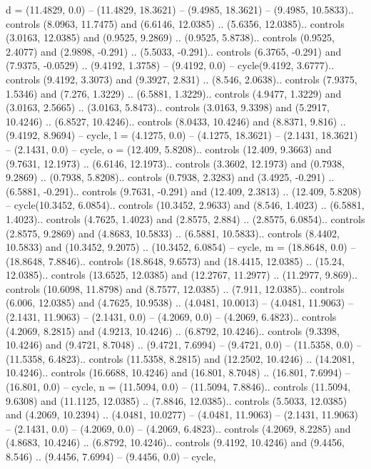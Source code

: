 {d} = {(11.4829, 0.0) -- (11.4829, 18.3621) -- (9.4985, 18.3621) -- (9.4985, 10.5833).. controls (8.0963, 11.7475) and (6.6146, 12.0385) .. (5.6356, 12.0385).. controls (3.0163, 12.0385) and (0.9525, 9.2869) .. (0.9525, 5.8738).. controls (0.9525, 2.4077) and (2.9898, -0.291) .. (5.5033, -0.291).. controls (6.3765, -0.291) and (7.9375, -0.0529) .. (9.4192, 1.3758) -- (9.4192, 0.0) -- cycle(9.4192, 3.6777).. controls (9.4192, 3.3073) and (9.3927, 2.831) .. (8.546, 2.0638).. controls (7.9375, 1.5346) and (7.276, 1.3229) .. (6.5881, 1.3229).. controls (4.9477, 1.3229) and (3.0163, 2.5665) .. (3.0163, 5.8473).. controls (3.0163, 9.3398) and (5.2917, 10.4246) .. (6.8527, 10.4246).. controls (8.0433, 10.4246) and (8.8371, 9.816) .. (9.4192, 8.9694) -- cycle},
{l} = {(4.1275, 0.0) -- (4.1275, 18.3621) -- (2.1431, 18.3621) -- (2.1431, 0.0) -- cycle},
{o} = {(12.409, 5.8208).. controls (12.409, 9.3663) and (9.7631, 12.1973) .. (6.6146, 12.1973).. controls (3.3602, 12.1973) and (0.7938, 9.2869) .. (0.7938, 5.8208).. controls (0.7938, 2.3283) and (3.4925, -0.291) .. (6.5881, -0.291).. controls (9.7631, -0.291) and (12.409, 2.3813) .. (12.409, 5.8208) -- cycle(10.3452, 6.0854).. controls (10.3452, 2.9633) and (8.546, 1.4023) .. (6.5881, 1.4023).. controls (4.7625, 1.4023) and (2.8575, 2.884) .. (2.8575, 6.0854).. controls (2.8575, 9.2869) and (4.8683, 10.5833) .. (6.5881, 10.5833).. controls (8.4402, 10.5833) and (10.3452, 9.2075) .. (10.3452, 6.0854) -- cycle},
{m} = {(18.8648, 0.0) -- (18.8648, 7.8846).. controls (18.8648, 9.6573) and (18.4415, 12.0385) .. (15.24, 12.0385).. controls (13.6525, 12.0385) and (12.2767, 11.2977) .. (11.2977, 9.869).. controls (10.6098, 11.8798) and (8.7577, 12.0385) .. (7.911, 12.0385).. controls (6.006, 12.0385) and (4.7625, 10.9538) .. (4.0481, 10.0013) -- (4.0481, 11.9063) -- (2.1431, 11.9063) -- (2.1431, 0.0) -- (4.2069, 0.0) -- (4.2069, 6.4823).. controls (4.2069, 8.2815) and (4.9213, 10.4246) .. (6.8792, 10.4246).. controls (9.3398, 10.4246) and (9.4721, 8.7048) .. (9.4721, 7.6994) -- (9.4721, 0.0) -- (11.5358, 0.0) -- (11.5358, 6.4823).. controls (11.5358, 8.2815) and (12.2502, 10.4246) .. (14.2081, 10.4246).. controls (16.6688, 10.4246) and (16.801, 8.7048) .. (16.801, 7.6994) -- (16.801, 0.0) -- cycle},
{n} = {(11.5094, 0.0) -- (11.5094, 7.8846).. controls (11.5094, 9.6308) and (11.1125, 12.0385) .. (7.8846, 12.0385).. controls (5.5033, 12.0385) and (4.2069, 10.2394) .. (4.0481, 10.0277) -- (4.0481, 11.9063) -- (2.1431, 11.9063) -- (2.1431, 0.0) -- (4.2069, 0.0) -- (4.2069, 6.4823).. controls (4.2069, 8.2285) and (4.8683, 10.4246) .. (6.8792, 10.4246).. controls (9.4192, 10.4246) and (9.4456, 8.546) .. (9.4456, 7.6994) -- (9.4456, 0.0) -- cycle},
